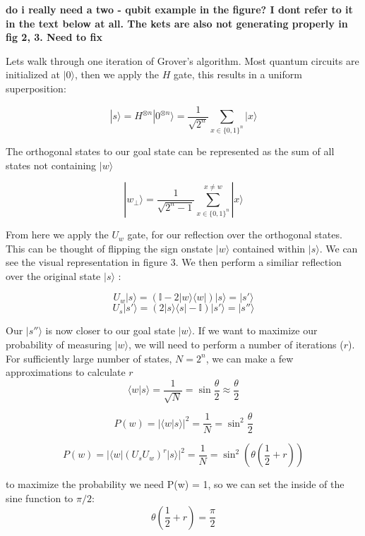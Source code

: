 \documentclass[twocolumn,showpacs,preprintnumbers,amsmath,amssymb]{revtex4}
\begin{document}
		
		\textbf{do i really need a two - qubit example in the figure? I dont refer to it in the text below at all. The kets are also not generating properly in fig 2, 3. Need to fix}
		
		Lets walk through one iteration of Grover's algorithm. Most quantum circuits are initialized at $|0\rangle$, then we apply the $H$ gate, this results in a uniform superposition:
		
		\begin{equation}
		 |s\rangle = H^{\otimes n} |0^{\otimes n} \rangle = \frac{1}{\sqrt{2^n}} \sum_{x\in\{0,1\}^n} |x\rangle
		\end{equation}
		
		The orthogonal states to our goal state can be represented as the sum of all states not containing $|w\rangle$
		
		$$ |w_\perp\rangle=  \frac{1}{\sqrt{2^n -1}} \sum_{x\in\{0,1\}^n}^{x \neq w} |x\rangle$$
		
		From here we apply the $U_w$ gate, for our reflection over the orthogonal states. This can be thought of flipping the sign onstate $|w\rangle$ contained within $|s\rangle$. We can see the visual representation in figure 3. We then perform a similiar reflection over the original state $|s\rangle$ :
		
		$$ U_w|s \rangle	=  (\mathbb {I} - 2|w \rangle \langle w|) |s \rangle = |s'\rangle$$
		$$ U_s|s' \rangle	=  (2|s \rangle \langle s| - \mathbb {I}) |s' \rangle = |s''\rangle$$
		
		Our $|s''\rangle$ is now closer to our goal state $|w\rangle$.  If we want to maximize our probability of measuring  $|w\rangle$, we will need to perform a number of iterations ($r$). For sufficiently large number of states, $N = 2^n$, we can make a few approximations to calculate $r$
		\begin{equation}
			\langle w | s \rangle = \frac{1}{\sqrt{N}} = \sin \frac{\theta}{2} \approx \frac{\theta}{2}
		\end{equation}
		
		
		$$P(w) = |\langle w | s \rangle|^2 = \frac{1}{N} = \sin^2 \frac{\theta}{2} $$
		
		$$P(w) = |\langle w |(U_sU_w)^r |s \rangle|^2 = \frac{1}{N} = \sin^2 (\theta(\frac{1}{2} + r)) $$
		
		to maximize the probability we need P(w) = 1, so we can set the inside of the sine function to $\pi/2$:
		$$ \theta \left(\frac{1}{2} + r \right) = \frac{\pi}{2}$$
		
\end{document}
